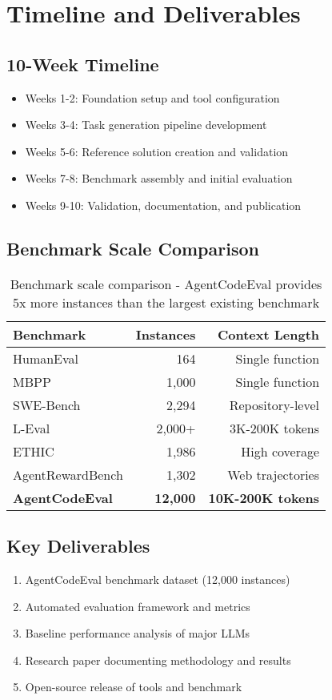 \documentclass{article}
\begin{document}
\section{Timeline and Deliverables}

\subsection{10-Week Timeline}
\begin{itemize}
    \item Weeks 1-2: Foundation setup and tool configuration
    \item Weeks 3-4: Task generation pipeline development
    \item Weeks 5-6: Reference solution creation and validation
    \item Weeks 7-8: Benchmark assembly and initial evaluation
    \item Weeks 9-10: Validation, documentation, and publication
\end{itemize}

\subsection{Benchmark Scale Comparison}
\begin{table}[h]
\centering
\begin{tabular}{@{}lrr@{}}
\toprule
Benchmark & Instances & Context Length \\
\midrule
HumanEval & 164 & Single function \\
MBPP & 1,000 & Single function \\
SWE-Bench & 2,294 & Repository-level \\
L-Eval & 2,000+ & 3K-200K tokens \\
ETHIC & 1,986 & High coverage \\
AgentRewardBench & 1,302 & Web trajectories \\
\textbf{AgentCodeEval} & \textbf{12,000} & \textbf{10K-200K tokens} \\
\bottomrule
\end{tabular}
\caption{Benchmark scale comparison - AgentCodeEval provides 5x more instances than the largest existing benchmark}
\end{table}

\subsection{Key Deliverables}
\begin{enumerate}
    \item AgentCodeEval benchmark dataset (12,000 instances)
    \item Automated evaluation framework and metrics
    \item Baseline performance analysis of major LLMs
    \item Research paper documenting methodology and results
    \item Open-source release of tools and benchmark
\end{enumerate}
\end{document}
